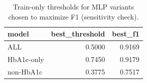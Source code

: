 \begin{table}[H]
\begin{center}
\begin{tabular}{lrr}
\toprule
model & best_threshold & best_f1 \\
\midrule
ALL & 0.5000 & 0.9169 \\
HbA1c-only & 0.7450 & 0.9179 \\
non-HbA1c & 0.3775 & 0.7517 \\
\bottomrule
\end{tabular}
\end{center}
\vspace{-5pt}
\caption{Train-only thresholds for MLP variants chosen to maximize F1 (sensitivity check).}
\label{tab:mlp_thresholds_f1_train}
\end{table}
